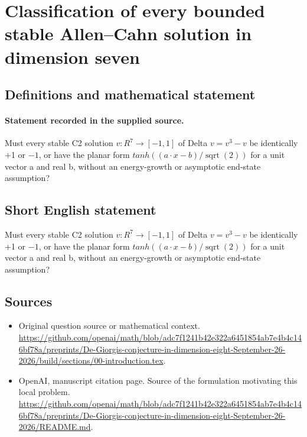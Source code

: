 \documentclass[11pt]{article}
\begin{document}
\section*{Classification of every bounded stable Allen–Cahn solution in dimension seven}\label{30007339}
\subsection{Definitions and mathematical statement}
\paragraph{Statement recorded in the supplied source.}
Must every stable C2 solution $v:R^7\to [-1,1]$ of Delta $v=v^3-v$ be identically +1 or $-1$, or have the planar form $tanh((a\cdot x-b)/\operatorname{sqrt}(2))$ for a unit vector a and real b, without an energy-growth or asymptotic end-state assumption?
\subsection{Short English statement}
Must every stable C2 solution $v:R^7\to [-1,1]$ of Delta $v=v^3-v$ be identically +1 or $-1$, or have the planar form $tanh((a\cdot x-b)/\operatorname{sqrt}(2))$ for a unit vector a and real b, without an energy-growth or asymptotic end-state assumption?
\subsection{Sources}
\begin{itemize}
\item[S1] Original question source or mathematical context.
\url{https://github.com/openai/math/blob/adc7f1241b42e322a6451854ab7e4b4c146bf78a/preprints/De-Giorgis-conjecture-in-dimension-eight-September-26-2026/build/sections/00-introduction.tex}.
\item[S2] OpenAI, manuscript citation page. Source of the formulation motivating this local problem.
\url{https://github.com/openai/math/blob/adc7f1241b42e322a6451854ab7e4b4c146bf78a/preprints/De-Giorgis-conjecture-in-dimension-eight-September-26-2026/README.md}.
\end{itemize}
\end{document}
